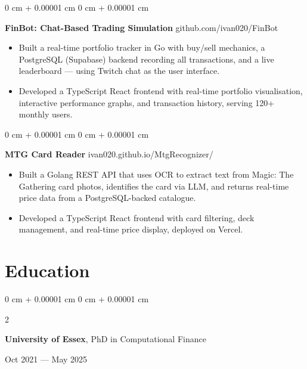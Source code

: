 \documentclass[6pt, letterpaper]{article}
\newenvironment{highlights}{
    \begin{itemize}[
        topsep=0.02 cm,
        parsep=0.02 cm,
        partopsep=0pt,
        itemsep=0pt,
        leftmargin=0 cm + 8pt
    ]
}{
    \end{itemize}
} %
\newenvironment{onecolentry}{
    \begin{adjustwidth}{
        0 cm + 0.00001 cm
    }{
        0 cm + 0.00001 cm
    }
}{
    \end{adjustwidth}
} %
\newenvironment{twocolentry}[2][]{
    \onecolentry
    \def\secondColumn{#2}
    \setcolumnwidth{\fill, 4.5 cm}
    \begin{paracol}{2}
}{
    \switchcolumn \raggedleft \secondColumn
    \end{paracol}
    \endonecolentry
} %
\begin{document}
    \begin{onecolentry}
        \textbf{FinBot: Chat-Based Trading Simulation} \hfill github.com/ivan020/FinBot

        \begin{highlights}

            \item Built a real-time portfolio tracker in Go with buy/sell mechanics, a PostgreSQL (Supabase) backend recording all transactions, and a live leaderboard — using Twitch chat as the user interface.
            \item Developed a TypeScript React frontend with real-time portfolio visualisation, interactive performance graphs, and transaction history, serving 120+ monthly users.

        \end{highlights}
    \end{onecolentry}

    \begin{onecolentry}
        \textbf{MTG Card Reader} \hfill ivan020.github.io/MtgRecognizer/

        \begin{highlights}

            \item Built a Golang REST API that uses OCR to extract text from Magic: The Gathering card photos, identifies the card via LLM, and returns real-time price data from a PostgreSQL-backed catalogue.
            \item Developed a TypeScript React frontend with card filtering, deck management, and real-time price display, deployed on Vercel.

        \end{highlights}
    \end{onecolentry}

    \section{Education}

            \begin{twocolentry}{
                Oct 2021 --- May 2025
            }
            \textbf{University of Essex}, PhD in Computational Finance
            \end{twocolentry}
\end{document}
